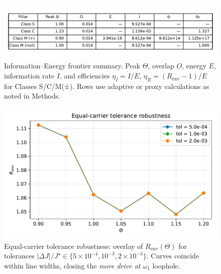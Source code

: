 \documentclass[11pt,letterpaper]{article}
\begin{document}
\begin{figure}[t]
\centering
\includegraphics[width=0.7\linewidth]{figTable_frontier.pdf}
\caption{Information–Energy frontier summary. Peak $\Theta$, overlap $O$, energy $E$, information rate $\dot I$, and efficiencies $\eta_I=\dot I/E$, $\eta_R=(R_{\mathrm{env}}-1)/E$ for Classes S/C/M(±). Rows use adaptive or proxy calculations as noted in Methods.}
\end{figure}

\begin{figure}[t]
\centering
\includegraphics[width=0.7\linewidth]{figO_equal_carrier_tolerance.pdf}
\caption{Equal-carrier tolerance robustness: overlay of $R_{\mathrm{env}}(\Theta)$ for tolerances $|\Delta J|/J^\star\in\{5\times10^{-4},10^{-3},2\times10^{-3}\}$. Curves coincide within line widths, closing the \emph{more drive at $\omega_1$} loophole.}
\end{figure}



\end{document}
